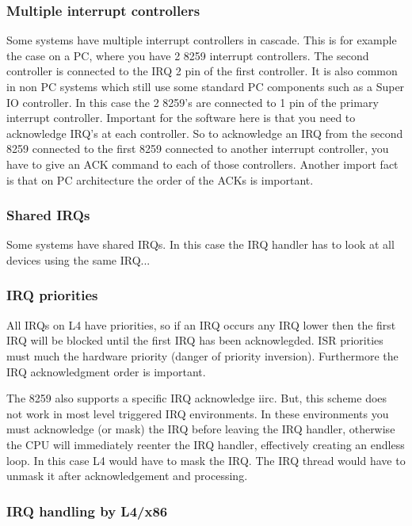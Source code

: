 \subsubsection{Multiple interrupt controllers}

Some systems have multiple interrupt controllers in cascade. This is
for example the case on a PC, where you have 2 8259 interrupt
controllers. The second controller is connected to the IRQ 2 pin of
the first controller. It is also common in non PC systems which still
use some standard PC components such as a Super IO controller. In this
case the 2 8259's are connected to 1 pin of the primary interrupt
controller. Important for the software here is that you need to
acknowledge IRQ's at each controller. So to acknowledge an IRQ from
the second 8259 connected to the first 8259 connected to another
interrupt controller, you have to give an ACK command to each of those
controllers.  Another import fact is that on PC architecture the order
of the ACKs is important.

\subsubsection{Shared IRQs}

Some systems have shared IRQs. In this case the IRQ handler has to
look at all devices using the same IRQ...

\subsubsection{IRQ priorities}

All IRQs on L4 have priorities, so if an IRQ occurs any IRQ lower then
the first IRQ will be blocked until the first IRQ has been
acknowlegded.  ISR priorities must much the hardware priority (danger
of priority inversion).  Furthermore the IRQ acknowledgment order is
important.

The 8259 also supports a specific IRQ acknowledge iirc. But, this
scheme does not work in most level triggered IRQ environments. In
these environments you must acknowledge (or mask) the IRQ before
leaving the IRQ handler, otherwise the CPU will immediately reenter
the IRQ handler, effectively creating an endless loop. In this case L4
would have to mask the IRQ. The IRQ thread would have to unmask it
after acknowledgement and processing.

\subsubsection{IRQ handling by L4/x86}

